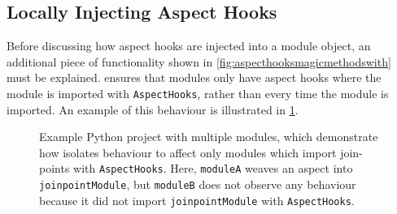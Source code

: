 \subsection{Locally Injecting Aspect Hooks}
\label{local_aspect_hook_effects}

Before discussing how aspect hooks are injected into a module object, an
additional piece of functionality shown in
\cref{fig:aspecthooksmagicmethodswith} must be explained. \pdsfthree{} ensures
that modules only have aspect hooks where the module is imported with
\lstinline{AspectHooks}, rather than every time the module is imported. An
example of this behaviour is illustrated in
\cref{fig:isolated_aspect_hook_weaving_illustration_reproduced}.


\begin{figure}
    \centering
    
    
    
    
    
    \caption{Example Python project with multiple modules, which demonstrate how
    \pdsfthree isolates \aspectoriented behaviour to affect only modules which
    import join-points with \lstinline{AspectHooks}. Here, \lstinline{moduleA}
    weaves an aspect into \lstinline{joinpointModule}, but \lstinline{moduleB}
    does not observe any \aspectoriented behaviour because it did not import
    \lstinline{joinpointModule} with \lstinline{AspectHooks}.}
    \label{fig:isolated_aspect_hook_weaving_illustration_reproduced}
\end{figure}


